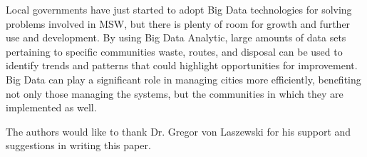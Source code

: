 \documentclass[sigconf]{acmart}
\begin{document}
Local governments have just started to adopt Big Data technologies for solving problems involved in MSW, but there is plenty of room for growth and further use and development.  By using Big Data Analytic, large amounts of data sets pertaining to specific communities waste, routes, and disposal can be used to identify trends and patterns that could highlight opportunities for improvement. Big Data can play a significant role in managing cities more efficiently, benefiting not only those managing the systems, but the communities in which they are implemented as well.
\begin{acks}

The authors would like to thank Dr. Gregor von Laszewski for his support and suggestions in writing this paper.

\end{acks}

 
\end{document}
